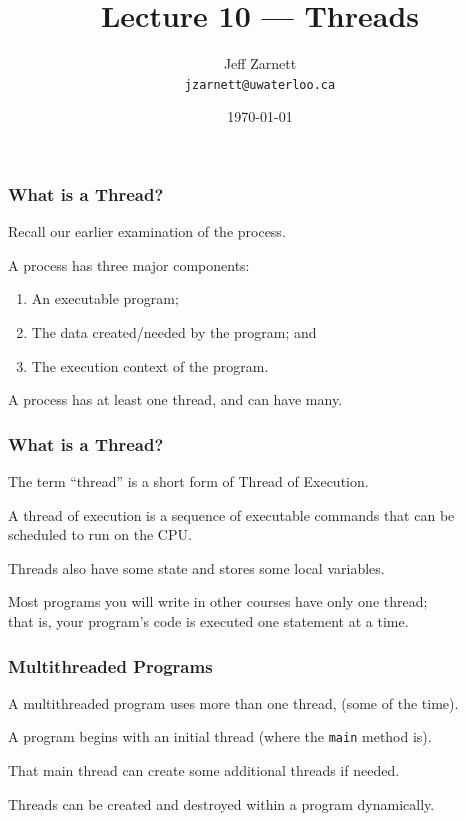 

\title{Lecture 10 --- Threads}

\author{Jeff Zarnett \\ \small \texttt{jzarnett@uwaterloo.ca}}
\date{\today}




\begin{frame}
  \titlepage

 \end{frame}

\begin{frame}
\frametitle{What is a Thread?}


Recall our earlier examination of the process. 

A process has three major components: 
\begin{enumerate}
\item An executable program;
\item The data created/needed by the program; and 
\item The execution context of the program.
\end{enumerate}

A process has at least one \alert{thread}, and can have many.

\end{frame}

\begin{frame}
\frametitle{What is a Thread?}

The term ``thread'' is a short form of \alert{Thread of Execution}.

  A thread of execution is a sequence of executable commands that can be scheduled to run on the CPU. 
  
  Threads also have some state and stores some local variables.
  
  Most programs you will write in other courses have only one thread;\\
  \quad that is, your program's code is executed one statement at a time.

\end{frame}

\begin{frame}
\frametitle{Multithreaded Programs}

A multithreaded program uses more than one thread, (some of the time).

  A program begins with an initial thread (where the \texttt{main} method is).
  
That main thread can create some additional threads if needed.

 Threads can be created and destroyed within a program dynamically.

\end{frame}

